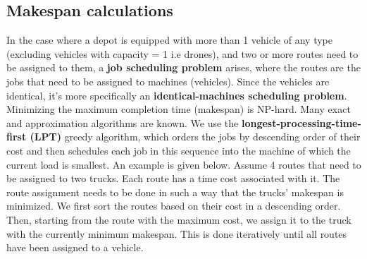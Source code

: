 \documentclass{article}
\begin{document}
	\subsection{Makespan calculations}
	In the case where a depot is equipped with more than 1 vehicle of any type (excluding vehicles with capacity = 1 i.e drones), and two or more routes need to be assigned to them, a \textbf{job scheduling problem} arises, where the routes are the jobs that need to be assigned to machines (vehicles). Since the vehicles are identical, it's more specifically an \textbf{identical-machines scheduling problem}. Minimizing the maximum completion time (makespan) is NP-hard. Many exact and approximation algorithms are known. We use the \textbf{longest-processing-time-first (LPT)} greedy algorithm, which orders the jobs by descending order of their cost and then schedules each job in this sequence into the machine of which the current load is smallest.
	An example is given below.
	Assume 4 routes that need to be assigned to two trucks. Each route has a time cost associated with it. The route assignment needs to be done in such a way that the trucks' makespan is minimized. We first sort the routes based on their cost in a descending order. Then, starting from the route with the maximum cost, we assign it to the truck with the currently minimum makespan. This is done iteratively until all routes have been assigned to a vehicle. 
	
	\newpage
	\twocolumn
	
\end{document}
